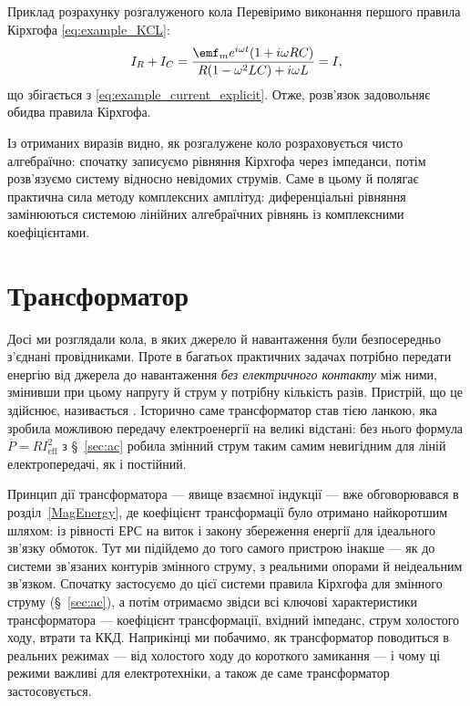 \begin{Example}{Приклад розрахунку розгалуженого кола}
Перевіримо виконання першого правила Кірхгофа \eqref{eq:example_KCL}:
\begin{equation*}
	I_R + I_C = \frac{\emf_m e^{i\omega t}(1 + i\omega RC)}{R(1 - \omega^2 LC) + i\omega L} = I,
\end{equation*}
що збігається з \eqref{eq:example_current_explicit}. Отже, розв'язок задовольняє обидва правила Кірхгофа.

Із отриманих виразів видно, як розгалужене коло розраховується чисто алгебраїчно: спочатку записуємо рівняння Кірхгофа через імпеданси, потім розв'язуємо систему відносно невідомих струмів. Саме в цьому й полягає практична сила методу комплексних амплітуд: диференціальні рівняння замінюються системою лінійних алгебраїчних рівнянь із комплексними коефіцієнтами.
\end{Example}

\section{Трансформатор}\hypertarget{transformer}{}
\label{sec:transformer}

Досі ми розглядали кола, в яких джерело й навантаження були
безпосередньо з'єднані провідниками. Проте в багатьох практичних
задачах потрібно передати енергію від джерела до навантаження
\emph{без електричного контакту} між ними, змінивши при цьому
напругу й струм у потрібну кількість разів. Пристрій, що це
здійснює, називається . Історично саме
трансформатор став тією ланкою, яка зробила можливою передачу
електроенергії на великі відстані: без нього формула
$\overline{P}=RI_{\text{eff}}^2$ з \S~\ref{sec:ac} робила
змінний струм таким самим невигідним для ліній електропередачі,
як і постійний.

Принцип дії трансформатора --- явище взаємної індукції --- вже
обговорювався в розділ~\ref{MagEnergy}, де коефіцієнт трансформації
було отримано найкоротшим шляхом: із рівності ЕРС на виток і
закону збереження енергії для ідеального зв'язку обмоток. Тут
ми підійдемо до того самого пристрою інакше --- як до системи
зв'язаних контурів змінного струму, з реальними опорами й
неідеальним зв'язком. Спочатку застосуємо до цієї системи правила
Кірхгофа для змінного струму (\S~\ref{sec:ac}), а потім
отримаємо звідси всі ключові характеристики трансформатора ---
коефіцієнт трансформації, вхідний імпеданс, струм холостого
ходу, втрати та ККД. Наприкінці ми побачимо, як трансформатор
поводиться в реальних режимах --- від холостого ходу до
короткого замикання --- і чому ці режими важливі для
електротехніки, а також де саме трансформатор застосовується.

